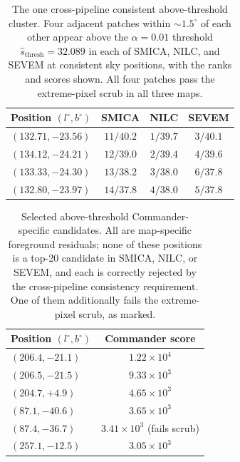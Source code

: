 \documentclass[fleqn,usenatbib]{mnras}
\begin{document}
\begin{table}
\centering
\caption{The one cross-pipeline consistent above-threshold cluster. Four adjacent patches within $\sim 1.5^\circ$ of each other appear above the $\alpha = 0.01$ threshold $\hat{s}_{\text{thresh}} = 32.089$ in each of SMICA, NILC, and SEVEM at consistent sky positions, with the ranks and scores shown. All four patches pass the extreme-pixel scrub in all three maps.}
\label{tab:consistent_supthresh}
\small
\begin{tabular}{lccc}
\hline
Position $(l^\circ, b^\circ)$ & SMICA & NILC & SEVEM \\
\hline
$(132.71, -23.56)$ & $11 / 40.2$ & $1 / 39.7$ & $3 / 40.1$ \\
$(134.12, -24.21)$ & $12 / 39.0$ & $2 / 39.4$ & $4 / 39.6$ \\
$(133.33, -24.30)$ & $13 / 38.2$ & $3 / 38.0$ & $6 / 37.8$ \\
$(132.80, -23.97)$ & $14 / 37.8$ & $4 / 38.0$ & $5 / 37.8$ \\
\hline
\end{tabular}
\end{table}

\begin{table}
\centering
\caption{Selected above-threshold Commander-specific candidates. All are map-specific foreground residuals; none of these positions is a top-20 candidate in SMICA, NILC, or SEVEM, and each is correctly rejected by the cross-pipeline consistency requirement. One of them additionally fails the extreme-pixel scrub, as marked.}
\label{tab:commander_residuals}
\small
\begin{tabular}{lc}
\hline
Position $(l^\circ, b^\circ)$ & Commander score \\
\hline
$(206.4, -21.1)$ & $1.22 \times 10^4$ \\
$(206.5, -21.5)$ & $9.33 \times 10^3$ \\
$(204.7, +4.9)$  & $4.65 \times 10^3$ \\
$(87.1, -40.6)$  & $3.65 \times 10^3$ \\
$(87.4, -36.7)$  & $3.41 \times 10^3$ (fails scrub) \\
$(257.1, -12.5)$ & $3.05 \times 10^3$ \\
\hline
\end{tabular}
\end{table}
\end{document}

